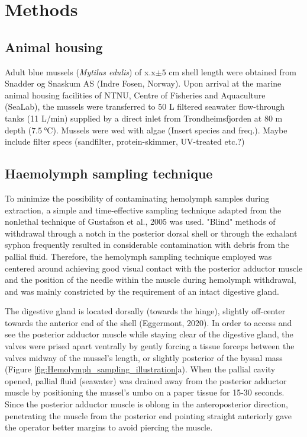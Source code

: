 \section{Methods}
\subsection{Animal housing}
Adult blue mussels (\emph{Mytilus edulis}) of x.x$\pm{5}$ cm shell length were obtained from Snadder og Snaskum AS (Indre Fosen, Norway). Upon arrival at the marine animal housing facilities of NTNU, Centre of Fisheries and Aquaculture (SeaLab), the mussels were transferred to 50 L filtered seawater flow-through tanks (11 L/min) supplied by a direct inlet from Trondheimsfjorden at 80 m depth ($\SI{7.5}{\celsius}$). Mussels were wed with algae (Insert species and freq.). Maybe include filter specs (sandfilter, protein-skimmer, UV-treated etc.?)

\subsection{Haemolymph sampling technique}
\label{subsection:haemolymph sampling technique}
To minimize the possibility of contaminating hemolymph samples during extraction, a simple and time-effective sampling technique adapted from the nonlethal technique of Gustafson et al., 2005 was used. "Blind" methods of withdrawal through a notch in the posterior dorsal shell or through the exhalant syphon frequently resulted in considerable contamination with debris from the pallial fluid. Therefore, the hemolymph sampling technique employed was centered around achieving good visual contact with the posterior adductor muscle and the position of the needle within the muscle during hemolymph withdrawal, and was mainly constricted by the requirement of an intact digestive gland.

The digestive gland is located dorsally (towards the hinge), slightly off-center towards the anterior end of the shell (Eggermont, 2020). In order to access and see the posterior adductor muscle while staying clear of the digestive gland, the valves were prised apart ventrally by gently forcing a tissue forceps between the valves midway of the mussel's length, or slightly posterior of the byssal mass (Figure \ref{fig:Hemolymph_sampling_illustration}a). When the pallial cavity opened, pallial fluid (seawater) was drained away from the posterior adductor muscle by positioning the mussel's umbo on a paper tissue for 15-30 seconds. Since the posterior adductor muscle is oblong in the anteroposterior direction, penetrating the muscle from the posterior end pointing straight anteriorly gave the operator better margins to avoid piercing the muscle.

